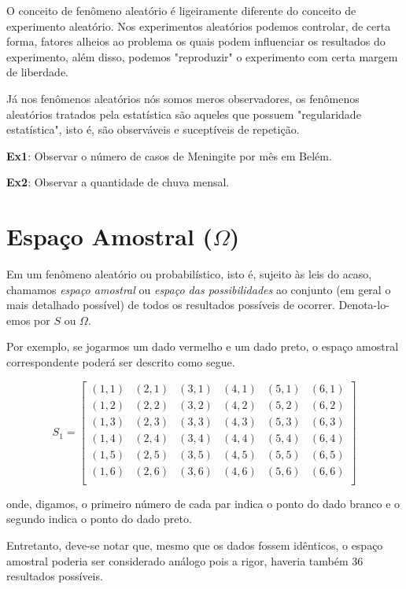 O conceito de fenômeno aleatório é ligeiramente diferente do
conceito de experimento aleatório. Nos experimentos aleatórios
podemos controlar, de certa forma, fatores alheios ao problema os
quais podem influenciar os resultados do experimento, além disso,
podemos "reproduzir" o experimento com certa margem de
liberdade.\vskip0.3cm

Já nos fenômenos aleatórios nós somos meros observadores, os
fenômenos aleatórios tratados pela estatística são aqueles que
possuem "regularidade estatística", isto é, são observáveis e
suceptíveis de repetição.\vskip0.3cm

\textbf{Ex1}: Observar o número de casos de Meningite por mês em
Belém. \vskip0.3cm

\textbf{Ex2}: Observar a quantidade de chuva mensal.\vskip0.3cm



\section{Espaço Amostral ($\Omega$)}

Em um fenômeno aleatório ou probabilístico, isto é, sujeito às
leis do acaso, chamamos \emph{espaço amostral} ou \emph{espaço das
possibilidades} ao conjunto (em geral o mais detalhado possível)
de todos os resultados possíveis de ocorrer. Denota-lo-emos por
$S$ ou $\Omega$.\vskip0.3cm

Por exemplo, se jogarmos um dado vermelho e um dado preto, o
espaço amostral correspondente poderá ser descrito como segue.

$$
S_{1} =
\left[%
\begin{array}{cccccc}
  (1,1) & (2,1) & (3,1) & (4,1) & (5,1) & (6,1) \\
  (1,2) & (2,2) & (3,2) & (4,2) & (5,2) & (6,2) \\
  (1,3) & (2,3) & (3,3) & (4,3) & (5,3) & (6,3) \\
  (1,4) & (2,4) & (3,4) & (4,4) & (5,4) & (6,4) \\
  (1,5) & (2,5) & (3,5) & (4,5) & (5,5) & (6,5) \\
  (1,6) & (2,6) & (3,6) & (4,6) & (5,6) & (6,6) \\
\end{array}%
\right]
$$

onde, digamos, o primeiro número de cada par indica o ponto do
dado branco e o segundo indica o ponto do dado preto.\vskip0.3cm

Entretanto, deve-se notar que, mesmo que os dados fossem
idênticos, o espaço amostral poderia ser considerado análogo pois
a rigor, haveria também 36 resultados possíveis.


